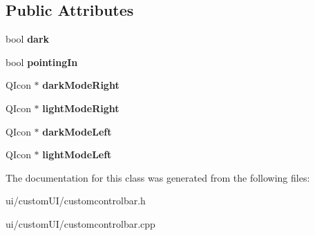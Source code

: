\subsection*{Public Attributes}
\begin{DoxyCompactItemize}
\item 
\mbox{\label{class_custom_control_bar_a76681714e7affb0027928048af5e711e}} 
bool {\bfseries dark}
\item 
\mbox{\label{class_custom_control_bar_adca75f1e870a3bb577263af59ba6e79a}} 
bool {\bfseries pointing\+In}
\item 
\mbox{\label{class_custom_control_bar_a6d2f367d644920dc19461e6b1cb71861}} 
Q\+Icon $\ast$ {\bfseries dark\+Mode\+Right}
\item 
\mbox{\label{class_custom_control_bar_a2178dc1a5e3a7048ee0da7901194c5b2}} 
Q\+Icon $\ast$ {\bfseries light\+Mode\+Right}
\item 
\mbox{\label{class_custom_control_bar_a6e5dfd8ab099b2d162be37b7be85ab07}} 
Q\+Icon $\ast$ {\bfseries dark\+Mode\+Left}
\item 
\mbox{\label{class_custom_control_bar_a79b7eba1c55662606ef4e0b401b86880}} 
Q\+Icon $\ast$ {\bfseries light\+Mode\+Left}
\end{DoxyCompactItemize}


The documentation for this class was generated from the following files\+:\begin{DoxyCompactItemize}
\item 
ui/custom\+U\+I/customcontrolbar.\+h\item 
ui/custom\+U\+I/customcontrolbar.\+cpp\end{DoxyCompactItemize}
